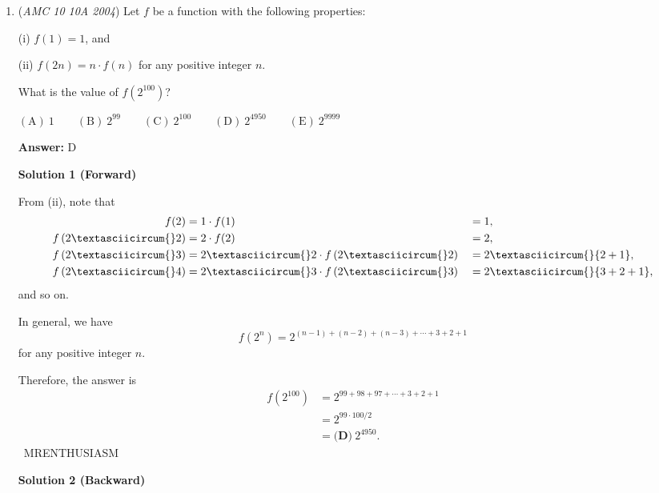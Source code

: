 \begin{enumerate}
 We have $2((-\frac{1}{2})^2+1^2+\frac {1}{r^2}+\frac{1}{r^2})=(-\frac{1}{2}+1+\frac{1}{r}+\frac{1}{r})^2$

 Simplifying, we get $\frac{10}{4}+\frac{4}{r^2}=\frac{1}{4}+\frac{2}{r}+\frac{4}{r^2}$
$\frac{2}{r}=\frac{9}{4}$
$r=\frac{8}{9} \Longrightarrow \qquad \textbf{(D)}$



	\item (\textit{AMC 10 10A 2004}) Let $f$ be a function with the following properties:


 (i) $f(1) = 1$, and


 (ii) $f(2n) = n \cdot f(n)$ for any positive integer $n$.


 What is the value of $f(2^{100})$?


 $\mathrm{(A) \ } 1 \qquad \mathrm{(B) \ } 2^{99} \qquad \mathrm{(C) \ } 2^{100} \qquad \mathrm{(D) \ } 2^{4950} \qquad \mathrm{(E) \ } 2^{9999}$

 \textbf{Answer: }D



\textbf{Solution 1 (Forward)}

From (ii), note that
 \begin{alignat*}{8} f(2) &= 1\cdot f(1) &&= 1, \\  f\left(2\textasciicircum{}2\right) &= 2\cdot f(2)  &&= 2, \\  f\left(2\textasciicircum{}3\right) &= 2\textasciicircum{}2\cdot f\left(2\textasciicircum{}2\right) &&= 2\textasciicircum{}{2+1}, \\ f\left(2\textasciicircum{}4\right) &= 2\textasciicircum{}3\cdot f\left(2\textasciicircum{}3\right) &&= 2\textasciicircum{}{3+2+1}, \end{alignat*}and so on.

 In general, we have 
 \[f\left(2^n\right)=2^{(n-1)+(n-2)+(n-3)+\cdots+3+2+1}\] for any positive integer $n.$

 Therefore, the answer is
 \begin{align*} f\left(2^{100}\right)&=2^{99+98+97+\cdots+3+2+1} \\ &=2^{99\cdot100/2} \\ &= \boxed{\textbf {(D)}\ 2^{4950}}. \end{align*}
~MRENTHUSIASM

 



\textbf{Solution 2 (Backward)}


\end{enumerate}
